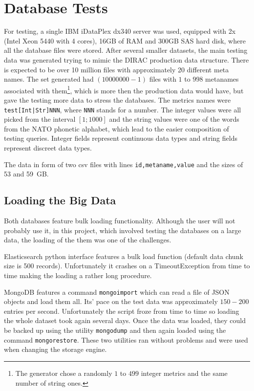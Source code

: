 
\section{Database Tests}

For testing, a single IBM iDataPlex dx340 server was used, equipped with 2x (Intel Xeon 5440 with 4 cores), 16GB
of RAM and 300GB SAS hard disk, where all the database files were stored. After several smaller datasets, 
the main testing data was generated trying to mimic the DIRAC production data structure. There is expected to
be over 10 million files with approximately 20 different meta names.
The set generated had $(10 000 000 - 1)$ files with $1$ to $998$ metanames associated with them\footnote{ 
The generator chose a randomly $1$ to $499$ integer metrics and the same number of string ones.}, which is more
then the production data would have, but gave the testing more data to stress the databases.
The metrics names were \texttt{test[Int|Str]NNN}, where \texttt{NNN} stands for a number. The
integer values were all picked from the interval $[1;1000]$ and the string values were one of the
words from the NATO phonetic alphabet\cite{NATO}, which lead to the easier composition of testing queries. 
Integer fields represent continuous data types and string fields represent discreet data types.

The data in form of two csv files with lines \texttt{id,metaname,value} and the sizes of 53 and 59~GB.

\subsection{Loading the Big Data}

Both databases feature bulk loading functionality. Although the user will not probably use it, in
this project, which involved testing the databases on a large data, the loading of the them was one 
of the challenges.

Elasticsearch python interface features a bulk load function (default data chunk size is 500 records). 
Unfortunately it crashes on a TimeoutException from time to time making the loading a rather long procedure. 

MongoDB features a command \texttt{mongoimport} which can read a file of JSON objects and load
them all. Its' pace on the test data was approximately $150-200$ entries per second. Unfortunately 
the script froze from time to time so loading the whole dataset took again several days. Once the data was
loaded, they could be backed up using the utility \texttt{mongodump} and then again loaded using the 
command \texttt{mongorestore}. These two utilities ran without problems and were used when changing the 
storage engine.

